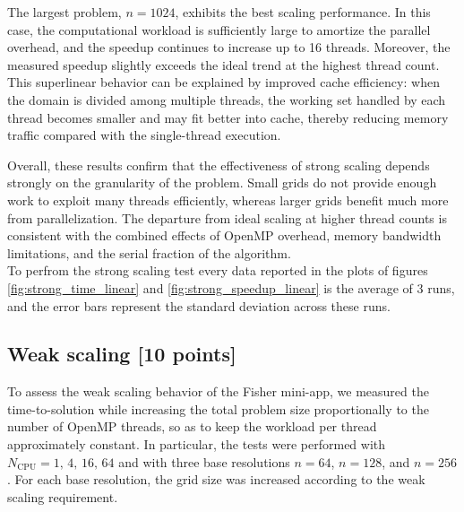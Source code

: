 \documentclass[unicode,10pt,a4paper,oneside,numbers=endperiod,openany]{scrartcl}
\begin{document}
The largest problem, \(n=1024\), exhibits the best scaling performance. In this case, the computational workload is sufficiently large to amortize the parallel overhead, and the speedup continues to increase up to 16 threads. Moreover, the measured speedup slightly exceeds the ideal trend at the highest thread count. This superlinear behavior can be explained by improved cache efficiency: when the domain is divided among multiple threads, the working set handled by each thread becomes smaller and may fit better into cache, thereby reducing memory traffic compared with the single-thread execution.

Overall, these results confirm that the effectiveness of strong scaling depends strongly on the granularity of the problem. Small grids do not provide enough work to exploit many threads efficiently, whereas larger grids benefit much more from parallelization. The departure from ideal scaling at higher thread counts is consistent with the combined effects of OpenMP overhead, memory bandwidth limitations, and the serial fraction of the algorithm.\\

To perfrom the strong scaling test every data reported in the plots of figures \ref{fig:strong_time_linear} and \ref{fig:strong_speedup_linear} is the average of 3 runs, and the error bars represent the standard deviation across these runs.\\

\subsection{Weak scaling [10 points]}
To assess the weak scaling behavior of the Fisher mini-app, we measured the time-to-solution while increasing the total problem size proportionally to the number of OpenMP threads, so as to keep the workload per thread approximately constant. In particular, the tests were performed with $N_{\mathrm{CPU}} = 1,\,4,\,16,\,64 $ and with three base resolutions \(n=64\), \(n=128\), and \(n=256\). For each base resolution, the grid size was increased according to the weak scaling requirement.\\
\end{document}
